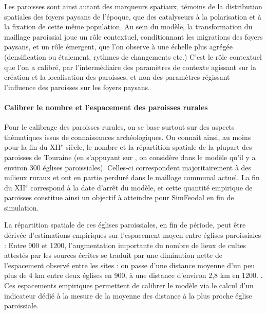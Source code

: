 Les paroisses sont ainsi autant des marqueurs spatiaux, témoins de la distribution spatiales des foyers paysans de l'époque, que des catalyseurs à la polarisation et à la fixation de cette même population.
Au sein du modèle, la transformation du maillage paroissial joue un rôle contextuel, conditionnant les migrations des foyers paysans, et un rôle émergent, que l'on observe à une échelle plus agrégée (densification ou étalement, rythmes de changements etc.)
C'est le rôle contextuel que l'on a calibré, par l'intermédiaire des paramètres de contexte agissant sur la création et la localisation des paroisses, et non des paramètres régissant l'influence des paroisses sur les foyers paysans.

\paragraph{Calibrer le nombre et l'espacement des paroisses \og rurales\fg{}}

Pour le calibrage des paroisses \og rurales\fg{}, on se base surtout sur des aspects thématiques issus de connaissances archéologiques.
On connaît ainsi, au moins pour la fin du XII$^e$ siècle, le nombre et la répartition spatiale de la plupart des paroisses de Touraine (en s'appuyant sur \textcite[31]{zadora-rio_paroisses_2008}, on considère dans le modèle qu'il y a environ 300 églises paroissiales).
Celles-ci correspondent majoritairement à des milieux ruraux et ont en partie perduré dans le maillage communal actuel.
La fin du XII$^e$ correspond à la date d'arrêt du modèle, et cette quantité empirique de paroisses constitue ainsi un objectif à atteindre pour SimFeodal en fin de simulation.

La répartition spatiale de ces églises paroissiales, en fin de période, peut être dérivée d'estimations empiriques sur l'espacement moyen entre églises paroissiales :
\og Entre 900 et 1200, l'augmentation importante du nombre de lieux de cultes attestés par les sources écrites se traduit par une diminution nette de l'espacement observé entre les sites : on passe d'une distance moyenne d'un peu plus de 4 km entre deux églises en 900, à une distance d'environ 2,8 km en 1200.\fg{} \autocite[261]{chareille_dynamiques_2008}.
Ces espacements empiriques permettent de calibrer le modèle via le calcul d'un indicateur dédié à la mesure de la moyenne des distance à la plus proche église paroissiale.


